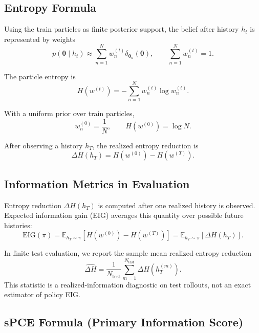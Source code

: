 \documentclass[11pt]{article}
\newcommand{\thetaVec}{\bm{\theta}}
\begin{document}
\subsection{Entropy Formula}

Using the train particles as finite posterior support, the belief after history $h_t$ is represented by weights
\begin{equation}
 p(\thetaVec\mid h_t)\approx \sum_{n=1}^{N} w_n^{(t)}\delta_{\thetaVec_n}(\thetaVec),
 \qquad
 \sum_{n=1}^{N}w_n^{(t)}=1.
\end{equation}

The particle entropy is
\begin{equation}
 H(w^{(t)})
 =
 -\sum_{n=1}^{N}w_n^{(t)}\log w_n^{(t)}.
\end{equation}

With a uniform prior over train particles,
\begin{equation}
 w_n^{(0)}=\frac{1}{N},
 \qquad
 H(w^{(0)})=\log N.
\end{equation}

After observing a history $h_T$, the realized entropy reduction is
\begin{equation}
 \Delta H(h_T)
 =
 H(w^{(0)})-H(w^{(T)}).
\end{equation}

\subsection{Information Metrics in Evaluation}

Entropy reduction $\Delta H(h_T)$ is computed after one realized history is observed. Expected information gain (EIG) averages this quantity over possible future histories:
\begin{equation}
 \mathrm{EIG}(\pi)
 =
 \mathbb{E}_{h_T\sim \pi}
 \left[
 H(w^{(0)})-H(w^{(T)})
 \right]
 =
 \mathbb{E}_{h_T\sim \pi}[\Delta H(h_T)].
\end{equation}

In finite test evaluation, we report the sample mean realized entropy reduction
\begin{equation}
 \widehat{\Delta H}
 =
 \frac{1}{N_{\mathrm{test}}}
 \sum_{m=1}^{N_{\mathrm{test}}}
 \Delta H(h_T^{(m)}).
\end{equation}
This statistic is a realized-information diagnostic on test rollouts, not an exact estimator of policy EIG.

\subsection{sPCE Formula (Primary Information Score)}
\end{document}
